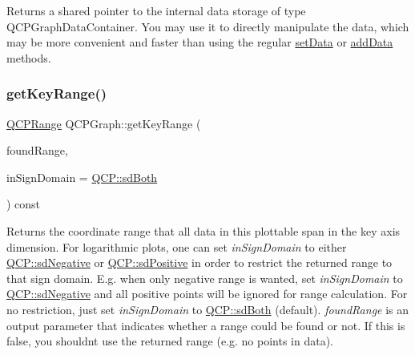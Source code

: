 Returns a shared pointer to the internal data storage of type Q\+C\+P\+Graph\+Data\+Container. You may use it to directly manipulate the data, which may be more convenient and faster than using the regular \hyperlink{class_q_c_p_graph_a1eae9429a316b008e2d99b2d65a54395}{set\+Data} or \hyperlink{class_q_c_p_graph_ae0555c0d3fe0fa7cb8628f88158d420f}{add\+Data} methods. \mbox{\label{class_q_c_p_graph_aac47c6189e3aea46ea46939e5d14796c}} 
\subsubsection{\texorpdfstring{get\+Key\+Range()}{getKeyRange()}}
{\footnotesize\ttfamily \hyperlink{class_q_c_p_range}{Q\+C\+P\+Range} Q\+C\+P\+Graph\+::get\+Key\+Range (\begin{DoxyParamCaption}\item[{bool \&}]{found\+Range,  }\item[{\hyperlink{namespace_q_c_p_afd50e7cf431af385614987d8553ff8a9}{Q\+C\+P\+::\+Sign\+Domain}}]{in\+Sign\+Domain = {\ttfamily \hyperlink{namespace_q_c_p_afd50e7cf431af385614987d8553ff8a9aa38352ef02d51ddfa4399d9551566e24}{Q\+C\+P\+::sd\+Both}} }\end{DoxyParamCaption}) const\hspace{0.3cm}{\ttfamily [virtual]}}

Returns the coordinate range that all data in this plottable span in the key axis dimension. For logarithmic plots, one can set {\itshape in\+Sign\+Domain} to either \hyperlink{namespace_q_c_p_afd50e7cf431af385614987d8553ff8a9a2d18af0bc58f6528d1e82ce699fe4829}{Q\+C\+P\+::sd\+Negative} or \hyperlink{namespace_q_c_p_afd50e7cf431af385614987d8553ff8a9a584784b75fb816abcc627cf743bb699f}{Q\+C\+P\+::sd\+Positive} in order to restrict the returned range to that sign domain. E.\+g. when only negative range is wanted, set {\itshape in\+Sign\+Domain} to \hyperlink{namespace_q_c_p_afd50e7cf431af385614987d8553ff8a9a2d18af0bc58f6528d1e82ce699fe4829}{Q\+C\+P\+::sd\+Negative} and all positive points will be ignored for range calculation. For no restriction, just set {\itshape in\+Sign\+Domain} to \hyperlink{namespace_q_c_p_afd50e7cf431af385614987d8553ff8a9aa38352ef02d51ddfa4399d9551566e24}{Q\+C\+P\+::sd\+Both} (default). {\itshape found\+Range} is an output parameter that indicates whether a range could be found or not. If this is false, you shouldn\textquotesingle{}t use the returned range (e.\+g. no points in data).

